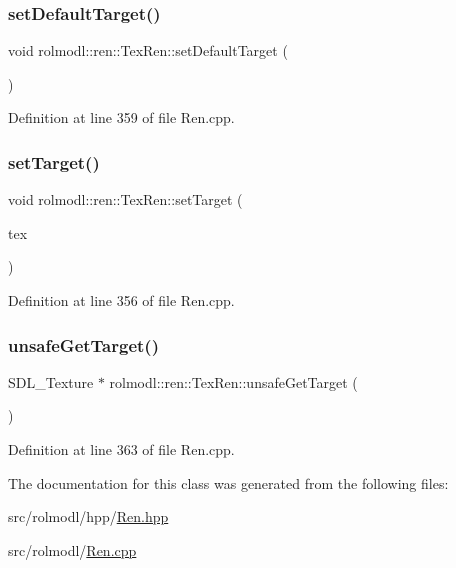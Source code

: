 \subsubsection{\texorpdfstring{setDefaultTarget()}{setDefaultTarget()}}
{\footnotesize\ttfamily void rolmodl\+::ren\+::\+Tex\+Ren\+::set\+Default\+Target (\begin{DoxyParamCaption}{ }\end{DoxyParamCaption})}



Definition at line 359 of file Ren.\+cpp.

\mbox{\label{classrolmodl_1_1blend_mode_1_1_tex_ren_ad3a858ec69feebfdc8b05d6927b0c5b7}} 
\subsubsection{\texorpdfstring{setTarget()}{setTarget()}}
{\footnotesize\ttfamily void rolmodl\+::ren\+::\+Tex\+Ren\+::set\+Target (\begin{DoxyParamCaption}\item[{Ren\+Tex \&}]{tex }\end{DoxyParamCaption})}



Definition at line 356 of file Ren.\+cpp.

\mbox{\label{classrolmodl_1_1blend_mode_1_1_tex_ren_a10f9040e96eac72a50cb89f1ee30a579}} 
\subsubsection{\texorpdfstring{unsafeGetTarget()}{unsafeGetTarget()}}
{\footnotesize\ttfamily S\+D\+L\+\_\+\+Texture $\ast$ rolmodl\+::ren\+::\+Tex\+Ren\+::unsafe\+Get\+Target (\begin{DoxyParamCaption}{ }\end{DoxyParamCaption})\hspace{0.3cm}{\ttfamily [noexcept]}}



Definition at line 363 of file Ren.\+cpp.



The documentation for this class was generated from the following files\+:\begin{DoxyCompactItemize}
\item 
src/rolmodl/hpp/\mbox{\hyperlink{_ren_8hpp}{Ren.\+hpp}}\item 
src/rolmodl/\mbox{\hyperlink{_ren_8cpp}{Ren.\+cpp}}\end{DoxyCompactItemize}
